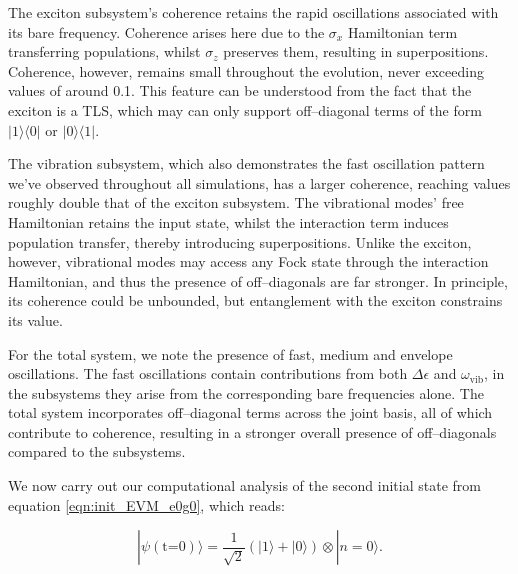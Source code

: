 \documentclass[11pt]{article}
\newcounter{subsubsubsection}[subsubsection]
\begin{document}
The exciton subsystem's coherence retains the rapid oscillations associated with its bare frequency. Coherence arises here due to the $\sigma_x$ Hamiltonian term transferring populations, whilst $\sigma_z$ preserves them, resulting in  superpositions. Coherence, however, remains small throughout the evolution, never exceeding values of around 0.1. This feature can be understood from the fact that the exciton is a TLS, which may can only support off--diagonal terms of the form $|1\rangle\langle 0|$ or $|0\rangle\langle 1|$.

The vibration subsystem, which also demonstrates the fast oscillation pattern we've observed throughout all simulations, has a larger coherence, reaching values roughly double that of the exciton subsystem. The vibrational modes' free Hamiltonian retains the input state, whilst the interaction term induces population transfer, thereby introducing superpositions. Unlike the exciton, however, vibrational modes may access any Fock state through the interaction Hamiltonian, and thus the presence of off--diagonals are far stronger. In principle, its coherence could be unbounded, but entanglement with the exciton constrains its value.

For the total system, we note the presence of fast, medium and envelope oscillations. The fast oscillations contain contributions from both $\Delta\epsilon$ and $\omega_{\scriptscriptstyle \text{vib}}$, in the subsystems they arise from the corresponding bare frequencies alone. The total system incorporates off--diagonal terms across the joint basis, all of which contribute to coherence, resulting in a stronger overall presence of off--diagonals compared to the subsystems.


We now carry out our computational analysis of the second initial state from equation \ref{eqn:init_EVM_e0g0}, which reads:

\begin{equation*}
    |\psi (\text{t=0})\rangle = \frac{1}{\sqrt{2}}(|1\rangle + |0\rangle)\otimes|n=0\rangle.
\end{equation*}
\end{document}
